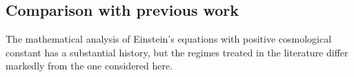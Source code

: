 \documentclass{amsart}
\newtheorem{theorem}{Theorem}[section]
\begin{document}

\subsection{Comparison with previous work}

The mathematical analysis of Einstein's equations with positive cosmological constant has a substantial history, but the regimes treated in the literature differ markedly from the one considered here.
\end{document}
